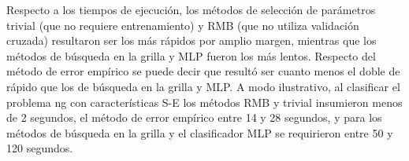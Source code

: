 \documentclass[12pt,bibliography=oldstyle,DIV=12,parskip=half-,titlepage]{scrartcl}
\begin{document}
Respecto a los tiempos de ejecución, los métodos de selección de
parámetros trivial (que no requiere entrenamiento) y RMB (que no
utiliza validación cruzada) resultaron ser los más rápidos por amplio
margen, mientras que los métodos de búsqueda en la grilla y MLP fueron
los más lentos.  Respecto del método de error empírico se puede decir
que resultó ser cuanto menos el doble de rápido que los de búsqueda en
la grilla y MLP. A modo ilustrativo, al clasificar el problema ng con
características S-E los métodos RMB y trivial insumieron menos de 2
segundos, el método de error empírico entre 14 y 28 segundos, y para
los métodos de búsqueda en la grilla y el
clasificador MLP se requirieron entre 50 y 120 segundos.


\end{document}
